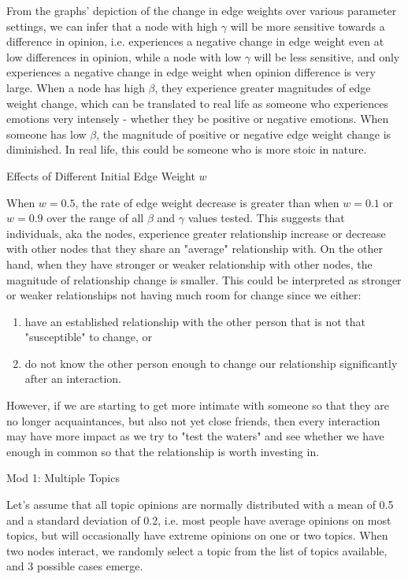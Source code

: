 \documentclass[11pt]{article}
\begin{document}
From the graphs' depiction of the change in edge weights over various
parameter settings, we can infer that a node with high \(\gamma\) will
be more sensitive towards a difference in opinion, i.e. experiences a
negative change in edge weight even at low differences in opinion, while
a node with low \(\gamma\) will be less sensitive, and only experiences
a negative change in edge weight when opinion difference is very large.
When a node has high \(\beta\), they experience greater magnitudes of
edge weight change, which can be translated to real life as someone who
experiences emotions very intensely - whether they be positive or
negative emotions. When someone has low \(\beta\), the magnitude of
positive or negative edge weight change is diminished. In real life,
this could be someone who is more stoic in nature.

Effects of Different Initial Edge Weight \(w\)

When \(w=0.5\), the rate of edge weight decrease is greater than when
\(w=0.1\) or \(w=0.9\) over the range of all \(\beta\) and \(\gamma\)
values tested. This suggests that individuals, aka the nodes, experience
greater relationship increase or decrease with other nodes that they
share an "average" relationship with. On the other hand, when they have
stronger or weaker relationship with other nodes, the magnitude of
relationship change is smaller. This could be interpreted as stronger or
weaker relationships not having much room for change since we either:

\begin{enumerate}
\def\labelenumi{\alph{enumi})}
\item
  have an established relationship with the other person that is not
  that "susceptible" to change, or
\item
  do not know the other person enough to change our relationship
  significantly after an interaction.
\end{enumerate}

However, if we are starting to get more intimate with someone so that
they are no longer acquaintances, but also not yet close friends, then
every interaction may have more impact as we try to "test the waters"
and see whether we have enough in common so that the relationship is
worth investing in.

    Mod 1: Multiple Topics

Let's assume that all topic opinions are normally distributed with a
mean of 0.5 and a standard deviation of 0.2, i.e. most people have
average opinions on most topics, but will occasionally have extreme
opinions on one or two topics. When two nodes interact, we randomly
select a topic from the list of topics available, and 3 possible cases
emerge.
\end{document}
